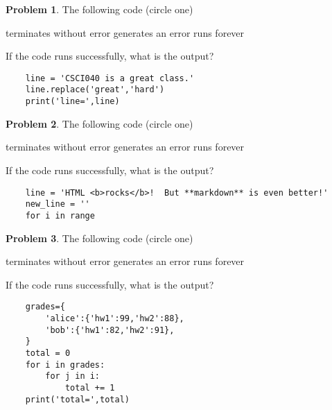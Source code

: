 \documentclass[10pt]{article}
\theoremstyle{definition}
\newtheorem{problem}{Problem}
\begin{document}
\begin{problem}
    The following code (circle one)

    \vspace{0.25in}
    \hspace{0.5in}terminates without error 
    \hspace{1in}generates an error
    \hspace{1in}runs forever
    \vspace{0.25in}

    \noindent
    If the code runs successfully, what is the output?
\end{problem}
\begin{lstlisting}
    line = 'CSCI040 is a great class.'
    line.replace('great','hard')
    print('line=',line)
\end{lstlisting}
\vspace{1in}

\newpage
\begin{problem}
    The following code (circle one)

    \vspace{0.25in}
    \hspace{0.5in}terminates without error 
    \hspace{1in}generates an error
    \hspace{1in}runs forever
    \vspace{0.25in}

    \noindent
    If the code runs successfully, what is the output?
\end{problem}
\begin{lstlisting}
    line = 'HTML <b>rocks</b>!  But **markdown** is even better!'
    new_line = ''
    for i in range
\end{lstlisting}
\vspace{0.75in}

\begin{problem}
    The following code (circle one)

    \vspace{0.25in}
    \hspace{0.5in}terminates without error 
    \hspace{1in}generates an error
    \hspace{1in}runs forever
    \vspace{0.25in}

    \noindent
    If the code runs successfully, what is the output?
\end{problem}
\begin{lstlisting}
    grades={
        'alice':{'hw1':99,'hw2':88},
        'bob':{'hw1':82,'hw2':91},
    }
    total = 0
    for i in grades:
        for j in i:
            total += 1
    print('total=',total)
\end{lstlisting}
\vspace{0.75in}
\end{document}
